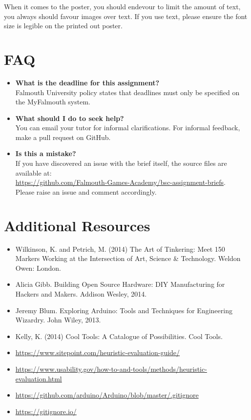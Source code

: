 \documentclass{../../fal_assignment}
\begin{document}
When it comes to the poster, you should endevour to limit the amount of text, 
you always should favour images over text. If you use text, please ensure the 
font size is legible on the printed out poster.

\section*{FAQ}

\begin{itemize}
	\item 	\textbf{What is the deadline for this assignment?} \\ 
    		Falmouth University policy states that deadlines must only be specified on the MyFalmouth system.
    		
	\item 	\textbf{What should I do to seek help?} \\ 
    		You can email your tutor for informal clarifications. For informal feedback, make a pull request on GitHub. 
    		
    	\item 	\textbf{Is this a mistake?} \\ 	
    		If you have discovered an issue with the brief itself, the source files are available at: \\
    		\url{https://github.com/Falmouth-Games-Academy/bsc-assignment-briefs}.\\
    		 Please raise an issue and comment accordingly.
\end{itemize}

\section*{Additional Resources}

\begin{itemize}
     \item Wilkinson, K. and Petrich, M. (2014) The Art of Tinkering: Meet 150 Markers Working at the Intersection of Art, Science \& Technology. Weldon Owen: London.
    \item Alicia Gibb. Building Open Source Hardware: DIY Manufacturing for Hackers and Makers. Addison Wesley, 2014. 
    \item Jeremy Blum. Exploring Arduino: Tools and Techniques for Engineering Wizardry. John Wiley, 2013. 
    \item Kelly, K. (2014) Cool Tools: A Catalogue of Possibilities. Cool Tools.
    \item \url{https://www.sitepoint.com/heuristic-evaluation-guide/}
    \item \url{https://www.usability.gov/how-to-and-tools/methods/heuristic-evaluation.html}
    \item \url{https://github.com/arduino/Arduino/blob/master/.gitignore}
     \item \url{https://gitignore.io/}
\end{itemize}
\end{document}
